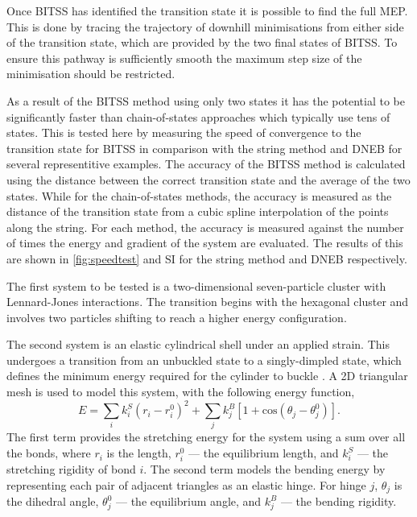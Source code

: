 \documentclass[aps,twocolumn]{revtex4-1}
\newcommand{\temp}[1]{{\leavevmode\color{red}#1}}
\begin{document}
\topic Once BITSS has identified the transition state it is possible to find the full MEP.
This is done by tracing the trajectory of downhill minimisations from either side of the transition state, which are provided by the two final states of BITSS.
To ensure this pathway is sufficiently smooth the maximum step size of the minimisation should be restricted.


\topic As a result of the BITSS method using only two states it has the potential to be significantly faster than chain-of-states approaches which typically use tens of states.
This is tested here by measuring the speed of convergence to the transition state for BITSS in comparison with the string method and DNEB for several representitive examples.
The accuracy of the BITSS method is calculated using the distance between the correct transition state and the average of the two states.
While for the chain-of-states methods, the accuracy is measured as the distance of the transition state from a cubic spline interpolation of the points along the string.
For each method, the accuracy is measured against the number of times the energy and gradient of the system are evaluated.
The results of this are shown in \cref{fig:speedtest} and \temp{SI} for the string method and DNEB respectively.

\topic The first system to be tested is a two-dimensional seven-particle cluster with Lennard-Jones interactions.
The transition begins with the hexagonal cluster and involves two particles shifting to reach a higher energy configuration.

\topic The second system is an elastic cylindrical shell under an applied strain.
This undergoes a transition from an unbuckled state to a singly-dimpled state, which defines the minimum energy required for the cylinder to buckle \cite{Panter2019}.
A 2D triangular mesh is used to model this system, with the following energy function,
\begin{equation}
  E = \sum_i k^S_i (r_i - r^0_i)^2 + \sum_j k^B_j [1 + \text{cos}(\theta_j - \theta^0_j)].
\end{equation}
The first term provides the stretching energy for the system using a sum over all the bonds, where $r_i$ is the length, $r^0_i$ --- the equilibrium length, and $k^S_i$ --- the stretching rigidity of bond $i$.
The second term models the bending energy by representing each pair of adjacent triangles as an elastic hinge.
For hinge $j$, $\theta_j$ is the dihedral angle, $\theta^0_j$ --- the equilibrium angle, and $k^B_j$ --- the bending rigidity.
\end{document}
